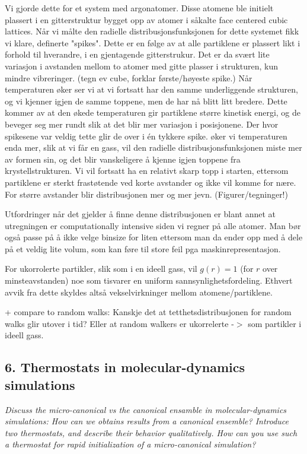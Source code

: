 \documentclass[a4paper,10pt]{article}
\begin{document}
Vi gjorde dette for et system med argonatomer. Disse atomene ble initielt plassert i en gitterstruktur bygget opp av atomer i såkalte face centered cubic lattices. Når vi målte den radielle distribusjonsfunksjonen for dette systemet fikk vi klare, definerte "spikes". Dette er en følge av at alle partiklene er plassert likt i forhold til hverandre, i en gjentagende gitterstrukur. Det er da svært lite variasjon i avstanden mellom to atomer med gitte plasser i strukturen, kun mindre vibreringer. (tegn ev cube, forklar første/høyeste spike.) Når temperaturen øker ser vi at vi fortsatt har den samme underliggende strukturen, og vi kjenner igjen de samme toppene, men de har nå blitt litt bredere. Dette kommer av at den økede temperaturen gir partiklene større kinetisk energi, og de beveger seg mer rundt slik at det blir mer variasjon i posisjonene. Der hvor spikesene var veldig tette glir de over i én tykkere spike. øker vi temperaturen enda mer, slik at vi får en gass, vil den radielle distribusjonsfunksjonen miste mer av formen sin, og det blir vanskeligere å kjenne igjen toppene fra krystellstrukturen. Vi vil fortsatt ha en relativt skarp topp i starten, ettersom partiklene er sterkt frastøtende ved korte avstander og ikke vil komme for nære. For større avstander blir distribusjonen mer og mer jevn. (Figurer/tegninger!)

Utfordringer når det gjelder å finne denne distribusjonen er blant annet at utregningen er computationally intensive siden vi regner på alle atomer. Man bør også passe på å ikke velge binsize for liten ettersom man da ender opp med å dele på et veldig lite volum, som kan føre til store feil pga maskinrepresentasjon.

For ukorrolerte partikler, slik som i en ideell gass, vil $g(r)=1$ (for $r$ over minsteavstanden) noe som tisvarer en uniform sannsynlighetsfordeling. Ethvert avvik fra dette skyldes altså vekselvirkninger mellom atomene/partiklene. 

+ compare to random walks: Kanskje det at tetthetsdistribusjonen for random walks glir utover i tid? Eller at random walkers er ukorrelerte -$>$ som partikler i ideell gass.   


\subsection*{6. Thermostats in molecular-dynamics simulations}
\textit{Discuss the micro-canonical vs the canonical ensamble in molecular-dynamics
simulations: How can we obtains results from a canonical ensemble? Introduce
two thermostats, and describe their behavior qualitatively. How can you use
such a thermostat for rapid initialization of a micro-canonical simulation?
}
\end{document}
